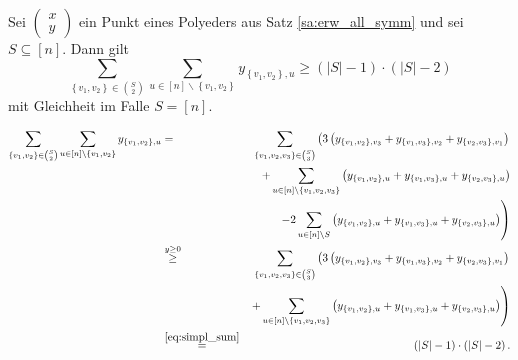 \documentclass[10p,a4paper,BCOR = 12mm, DIV=15]{scrbook}
\begin{document}
\begin{Prop}
\label{prop:erw_all_symm}
Sei $\left(
\begin{array}{c}
x \\
y
\end{array}
\right)$ ein Punkt eines Polyeders aus Satz \ref{sa:erw_all_symm} und sei $S \subseteq \left[n\right]$. Dann gilt
\begin{displaymath}
\sum_{\left\{v_1, v_2\right\} \in {S \choose 2}} \sum_{u \in \left[n\right] \backslash \left\{v_1, v_2\right\}} y_{\left\{v_1, v_2\right\}, u} \geq \left(\left|S\right| - 1\right) \cdot \left(\left|S\right| - 2\right)
\end{displaymath}
mit Gleichheit im Falle $S=\left[n\right]$.
\end{Prop}
\begin{bew}
\begin{eqnarray*}
\sum_{\left\{v_1, v_2\right\} \in {S \choose 2}} \sum_{u \in \left[n\right] \backslash \left\{v_1, v_2\right\}} y_{\left\{v_1, v_2\right\}, u} & = & \sum_{\left\{v_1, v_2, v_3\right\} \in {S \choose 3}} \left(
3 \left(y_{\left\{v_1, v_2\right\}, v_3} + y_{\left\{v_1, v_3\right\}, v_2} + y_{\left\{v_2, v_3\right\}, v_1}\right)
\right. \\
& & + \sum_{u \in  \left[n\right] \backslash \left\{v_1, v_2, v_3\right\}} \left(y_{\left\{v_1, v_2\right\}, u} + y_{\left\{v_1, v_3\right\}, u} + y_{\left\{v_2, v_3\right\}, u}\right) \\
& & \left.- 2 \sum_{u \in \left[n\right] \backslash S} \left(y_{\left\{v_1, v_2\right\}, u} + y_{\left\{v_1, v_3\right\}, u} + y_{\left\{v_2, v_3\right\}, u}\right)\right) \\
& \stackrel{y \geq 0}{\geq} & \sum_{\left\{v_1, v_2, v_3\right\} \in {S \choose 3}} \left(
3 \left(y_{\left\{v_1, v_2\right\}, v_3} + y_{\left\{v_1, v_3\right\}, v_2} + y_{\left\{v_2, v_3\right\}, v_1}\right)
\right. \\
& & \left.+ \sum_{u \in  \left[n\right] \backslash \left\{v_1, v_2, v_3\right\}} \left(y_{\left\{v_1, v_2\right\}, u} + y_{\left\{v_1, v_3\right\}, u} + y_{\left\{v_2, v_3\right\}, u}\right)\right) \\
& \stackrel{\eqref{eq:simpl_sum}}{=} & \left(\left|S\right| - 1\right) \cdot \left(\left|S\right| - 2\right).
\end{eqnarray*}
\end{bew}
\end{document}
